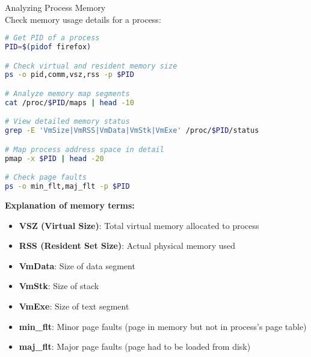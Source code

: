 \begin{example2}{Analyzing Process Memory}\\
    Check memory usage details for a process:
    
\begin{lstlisting}[language=bash, style=basesmol]
# Get PID of a process
PID=$(pidof firefox)

# Check virtual and resident memory size
ps -o pid,comm,vsz,rss -p $PID

# Analyze memory map segments
cat /proc/$PID/maps | head -10

# View detailed memory status
grep -E 'VmSize|VmRSS|VmData|VmStk|VmExe' /proc/$PID/status

# Map process address space in detail
pmap -x $PID | head -20

# Check page faults
ps -o min_flt,maj_flt -p $PID
\end{lstlisting}

    \tcblower
    
    \textbf{Explanation of memory terms:}
    \begin{itemize}
        \item \textbf{VSZ (Virtual Size)}: Total virtual memory allocated to process
        \item \textbf{RSS (Resident Set Size)}: Actual physical memory used
        \item \textbf{VmData}: Size of data segment
        \item \textbf{VmStk}: Size of stack
        \item \textbf{VmExe}: Size of text segment
        \item \textbf{min\_flt}: Minor page faults (page in memory but not in process's page table)
        \item \textbf{maj\_flt}: Major page faults (page had to be loaded from disk)
    \end{itemize}
\end{example2}

